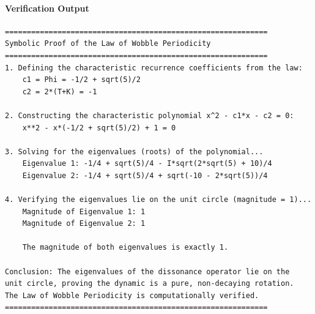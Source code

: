 \paragraph{Verification Output}
\begin{verbatim}
============================================================
Symbolic Proof of the Law of Wobble Periodicity
============================================================
1. Defining the characteristic recurrence coefficients from the law:
    c1 = Phi = -1/2 + sqrt(5)/2
    c2 = 2*(T+K) = -1

2. Constructing the characteristic polynomial x^2 - c1*x - c2 = 0:
    x**2 - x*(-1/2 + sqrt(5)/2) + 1 = 0

3. Solving for the eigenvalues (roots) of the polynomial...
    Eigenvalue 1: -1/4 + sqrt(5)/4 - I*sqrt(2*sqrt(5) + 10)/4
    Eigenvalue 2: -1/4 + sqrt(5)/4 + sqrt(-10 - 2*sqrt(5))/4

4. Verifying the eigenvalues lie on the unit circle (magnitude = 1)...
    Magnitude of Eigenvalue 1: 1
    Magnitude of Eigenvalue 2: 1

    The magnitude of both eigenvalues is exactly 1.

Conclusion: The eigenvalues of the dissonance operator lie on the
unit circle, proving the dynamic is a pure, non-decaying rotation.
The Law of Wobble Periodicity is computationally verified.
============================================================
\end{verbatim}


















